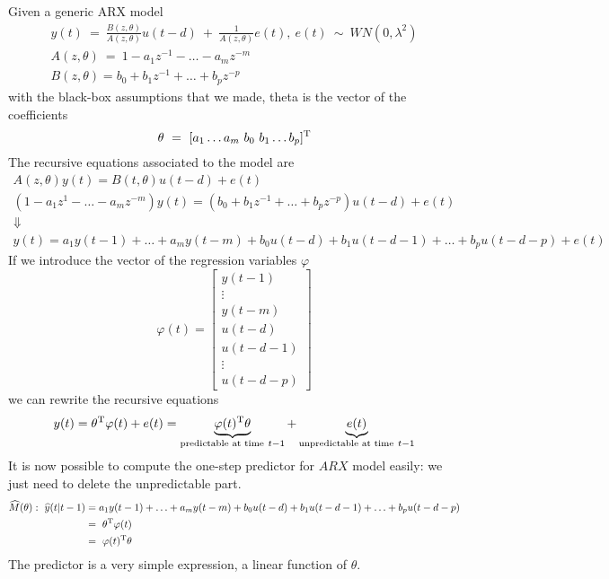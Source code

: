 Given a generic ARX model
\begin{gather*}
y( t) \ =\ \frac{B( z,\theta )}{A( z,\theta )} u( t-d) \ +\ \frac{1}{A( z,\theta )} e( t) ,\ e( t) \ \sim \ WN\left( 0,\lambda ^{2}\right)\\
A( z,\theta ) \ =\ 1-a_{1} z^{-1} -\dotsc -a_{m} z^{-m}\\
B( z,\theta ) =b_{0} +b_{1} z^{-1} +\dotsc +b_{p} z^{-p}
\end{gather*}
with the black-box assumptions that we made, theta is the vector of the coefficients
\begin{equation*}
\theta \ =\ [ a_{1} \dotsc a_{m} \ b_{0} \ b_{1} \dotsc b_{p}]^{\mathrm{T}}
\end{equation*}
The recursive equations associated to the model are
\begin{gather*}
A( z,\theta ) y( t) =B( t,\theta ) u( t-d) +e( t)\\
\left( 1-a_{1} z^{1} -\dotsc -a_{m} z^{-m}\right) y( t) =\left( b_{0} +b_{1} z^{-1} +\dotsc +b_{p} z^{-p}\right) u( t-d) +e( t)\\
\Downarrow \\
y( t) =a_{1} y( t-1) +\dotsc +a_{m} y( t-m) +b_{0} u( t-d) +b_{1} u( t-d-1) +\dotsc +b_{p} u( t-d-p) +e( t)
\end{gather*}
If we introduce the vector of the regression variables $ \varphi $
\begin{equation*}
\varphi ( t) =\begin{bmatrix}
y( t-1)\\
\vdots \\
y( t-m)\\
u( t-d)\\
u( t-d-1)\\
\vdots \\
u( t-d-p)
\end{bmatrix}
\end{equation*}
we can rewrite the recursive equations
\begin{equation*}
y( t) =\theta ^{\mathrm{T}} \varphi ( t) +e( t) =\underbrace{\varphi ( t)^{\mathrm{T}} \theta }_{\text{predictable at time} \ t-1} +\underbrace{e( t)}_{\text{unpredictable at time} \ t-1}
\end{equation*}
It is now possible to compute the one-step predictor for $ ARX$ model easily: we just need to delete the unpredictable part.
\begin{align*}
\widehat{M}( \theta ) :\ \widehat{y}( t|t-1) & =a_{1} y( t-1) +\dotsc +a_{m} y( t-m) +b_{0} u( t-d) +b_{1} u( t-d-1) +\dotsc +b_{p} u( t-d-p)\\
 & =\ \theta ^{\mathrm{T}} \varphi ( t) \ \\
 & =\ \varphi ( t)^{\mathrm{T}} \theta 
\end{align*}
The predictor is a very simple expression, a linear function of $ \theta $.


